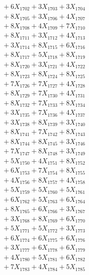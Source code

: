 \documentclass[a4paper,10pt]{article}
\begin{document}
{\begin{align}
&\;  + 6 X_{1702} + 3 X_{1703} + 3 X_{1704} \\[0.3ex]
&\;  + 8 X_{1705} + 3 X_{1706} + 4 X_{1707} \\[0.3ex]
&\;  + 8 X_{1708} + 4 X_{1709} + 7 X_{1710} \\[0.3ex]
&\;  + 8 X_{1711} + 3 X_{1712} + 4 X_{1713} \\[0.3ex]
&\;  + 3 X_{1714} + 8 X_{1715} + 6 X_{1716} \\[0.3ex]
&\;  + 8 X_{1717} + 5 X_{1718} + 8 X_{1719} \\[0.5ex]\allowbreak
&\;  + 8 X_{1720} + 3 X_{1721} + 4 X_{1722} \\[0.3ex]
&\;  + 8 X_{1723} + 8 X_{1724} + 8 X_{1725} \\[0.3ex]
&\;  + 7 X_{1726} + 7 X_{1727} + 4 X_{1728} \\[0.3ex]
&\;  + 8 X_{1729} + 7 X_{1730} + 4 X_{1731} \\[0.3ex]
&\;  + 8 X_{1732} + 7 X_{1733} + 8 X_{1734} \\[0.3ex]
&\;  + 3 X_{1735} + 7 X_{1736} + 4 X_{1737} \\[0.3ex]
&\;  + 3 X_{1738} + 8 X_{1739} + 3 X_{1740} \\[0.3ex]
&\;  + 8 X_{1741} + 7 X_{1742} + 8 X_{1743} \\[0.3ex]
&\;  + 8 X_{1744} + 8 X_{1745} + 3 X_{1746} \\[0.3ex]
&\;  + 7 X_{1747} + 8 X_{1748} + 3 X_{1749} \\[0.5ex]\allowbreak
&\;  + 5 X_{1750} + 4 X_{1751} + 8 X_{1752} \\[0.3ex]
&\;  + 6 X_{1753} + 7 X_{1754} + 8 X_{1755} \\[0.3ex]
&\;  + 4 X_{1756} + 8 X_{1757} + 4 X_{1758} \\[0.3ex]
&\;  + 5 X_{1759} + 5 X_{1760} + 5 X_{1761} \\[0.3ex]
&\;  + 6 X_{1762} + 5 X_{1763} + 6 X_{1764} \\[0.3ex]
&\;  + 8 X_{1765} + 6 X_{1766} + 3 X_{1767} \\[0.3ex]
&\;  + 3 X_{1768} + 8 X_{1769} + 6 X_{1770} \\[0.3ex]
&\;  + 5 X_{1771} + 5 X_{1772} + 3 X_{1773} \\[0.3ex]
&\;  + 6 X_{1774} + 6 X_{1775} + 6 X_{1776} \\[0.3ex]
&\;  + 3 X_{1777} + 6 X_{1778} + 6 X_{1779} \\[0.5ex]\allowbreak
&\;  + 4 X_{1780} + 5 X_{1781} + 6 X_{1782} \\[0.3ex]
&\;  + 7 X_{1783} + 4 X_{1784} + 5 X_{1785} \\[0.3ex]

\end{align}}
\end{document}
